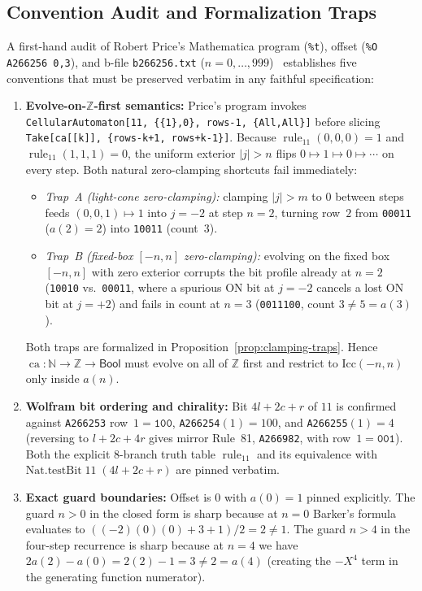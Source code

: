 \documentclass[11pt]{article}
\theoremstyle{definition}
\newcommand{\N}{\mathbb{N}}
\newcommand{\Z}{\mathbb{Z}}
\newcommand{\seq}[1]{\texttt{#1}}
\newcommand{\ruleTT}{\operatorname{rule}_{11}}
\newcommand{\ca}{\operatorname{ca}}
\begin{document}
\subsection{Convention Audit and Formalization Traps}
\label{sec:conventions}

A first-hand audit of Robert Price's Mathematica program (\texttt{\%t}), offset (\texttt{\%O A266256 0,3}), and b-file \texttt{b266256.txt} ($n = 0, \dots, 999$)~\cite{oeis266256} establishes five conventions that must be preserved verbatim in any faithful specification:
\begin{enumerate}
\item \textbf{Evolve-on-$\Z$-first semantics:} Price's program invokes \texttt{CellularAutomaton[11, \{\{1\},0\}, rows-1, \{All,All\}]} before slicing \texttt{Take[ca[[k]], \{rows-k+1, rows+k-1\}]}. Because $\ruleTT(0,0,0) = 1$ and $\ruleTT(1,1,1) = 0$, the uniform exterior $|j| > n$ flips $0 \mapsto 1 \mapsto 0 \mapsto \cdots$ on every step. Both natural zero-clamping shortcuts fail immediately:
\begin{itemize}
\item \emph{Trap~A (light-cone zero-clamping):} clamping $|j| > m$ to $0$ between steps feeds $(0,0,1) \mapsto 1$ into $j = -2$ at step $n = 2$, turning row~$2$ from \texttt{00011} ($a(2) = 2$) into \texttt{10011} (count~$3$).
\item \emph{Trap~B (fixed-box $[-n, n]$ zero-clamping):} evolving on the fixed box $[-n, n]$ with zero exterior corrupts the bit profile already at $n = 2$ (\texttt{10010} vs.\ \texttt{00011}, where a spurious ON bit at $j = -2$ cancels a lost ON bit at $j = +2$) and fails in count at $n = 3$ (\texttt{0011100}, count $3 \ne 5 = a(3)$).
\end{itemize}
Both traps are formalized in Proposition~\ref{prop:clamping-traps}. Hence $\ca : \N \to \Z \to \mathsf{Bool}$ must evolve on all of $\Z$ first and restrict to $\mathrm{Icc}(-n, n)$ only inside $a(n)$.
\item \textbf{Wolfram bit ordering and chirality:} Bit $4l + 2c + r$ of $11$ is confirmed against \seq{A266253} row~$1 = \mathtt{100}$, \seq{A266254}$(1) = 100$, and \seq{A266255}$(1) = 4$ (reversing to $l + 2c + 4r$ gives mirror Rule~81, \seq{A266982}, with row~$1 = \mathtt{001}$). Both the explicit $8$-branch truth table $\ruleTT$ and its equivalence with $\mathrm{Nat.testBit}\;11\;(4l + 2c + r)$ are pinned verbatim.
\item \textbf{Exact guard boundaries:} Offset is $0$ with $a(0) = 1$ pinned explicitly. The guard $n > 0$ in the closed form is sharp because at $n = 0$ Barker's formula evaluates to $((-2)(0)(0) + 3 + 1)/2 = 2 \ne 1$. The guard $n > 4$ in the four-step recurrence is sharp because at $n = 4$ we have $2a(2) - a(0) = 2(2) - 1 = 3 \ne 2 = a(4)$ (creating the $-X^4$ term in the generating function numerator).

\end{enumerate}
\end{document}
